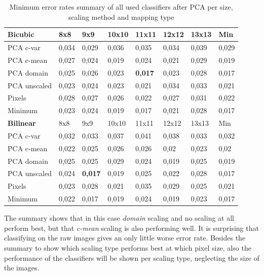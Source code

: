 \documentclass{article}
\begin{document}
\begin{table}[H]
  \small
  \centering
    \begin{tabular}{|l|llllll|l|}
    \hline
    \textbf{Bicubic} & 8x8   & 9x9   & 10x10 & 11x11 & 12x12 & 13x13 & Min \\
    \hline \hline
    PCA c-var & 0,034 & 0,029 & 0,036 & 0,035 & 0,034 & 0,039 & 0,029 \\
    PCA c-mean & 0,027 & 0,024 & 0,019 & 0,024 & 0,021 & 0,029 & 0,019 \\
    PCA domain & 0,025 & 0,026 & 0,023 & \textbf{0,017} & 0,023 & 0,028 & 0,017 \\
    PCA unscaled & 0,023 & 0,024 & 0,023 & 0,021 & 0,034 & 0,033 & 0,021 \\ 
    Pixels & 0,028 & 0,027 & 0,026 & 0,022 & 0,027 & 0,031 & 0,022 \\ \hline
		Minimum   & 0,023 & 0,024 & 0,019 & 0,017 & 0,021 & 0,028 & 0,017 \\
		\hline 
		\hline
    \textbf{Bilinear} & 8x8   & 9x9   & 10x10 & 11x11 & 12x12 & 13x13 & Min \\ \hline \hline
    PCA c-var & 0,032 & 0,033 & 0,037 & 0,041 & 0,038 & 0,033 & 0,032 \\
    PCA c-mean & 0,022 & 0,025 & 0,026 & 0,026 & 0,02  & 0,023 & 0,02 \\
    PCA domain & 0,025 & 0,025 & 0,029 & 0,024 & 0,019 & 0,025 & 0,019 \\
    PCA unscaled & 0,024 & \textbf{0,017} & 0,019 & 0,025 & 0,022 & 0,028 & 0,017 \\
    Pixels & 0,023 & 0,028 & 0,021 & 0,035 & 0,029 & 0,025 & 0,021 \\ \hline
		Minimum & 0,022 & 0,017 & 0,019 & 0,024 & 0,019 & 0,023 & 0,017 \\ 
    \hline
    \end{tabular}%
    \caption{Minimum error rates summary of all used classifiers after PCA per size, scaling method and mapping type} \label{table: error rate summary PCA}%
\end{table}%

The summary shows that in this case \textit{domain} scaling and no scaling at all perform best, but that \textit{c-mean} scaling is also performing well. It is surprising that classifying on the raw images gives an only little worse error rate. Besides the summary to show which scaling type performs best at which pixel size, also the performance of the classifiers will be shown per scaling type, neglecting the size of the images. 
\end{document}
